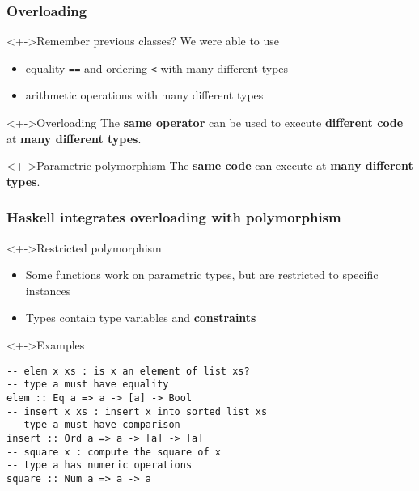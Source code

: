 \documentclass{beamer}
\subtitle{Type Classes --- Overloading in Haskell}
\begin{document}
\begin{frame}
  \titlepage
\end{frame}
\begin{frame}[fragile]
  \frametitle{Overloading}
  \begin{block}<+->{Remember previous classes?}
    We were able to use
    \begin{itemize}
    \item equality \texttt{==} and ordering \texttt{<} with many different types
    \item arithmetic operations with many different types
    \end{itemize}
  \end{block}
  \begin{block}<+->{Overloading}
    The \textbf{same operator} can be used to execute \textbf{different code} at \textbf{many different types}. 
  \end{block}
  \begin{block}<+->{Parametric polymorphism}
    The \textbf{same code} can execute at \textbf{many different types}.
  \end{block}
\end{frame}
\begin{frame}[fragile]
  \frametitle{Haskell integrates overloading with polymorphism}
  \begin{block}<+->{Restricted polymorphism}
    \begin{itemize}
    \item Some functions work on parametric types, but are restricted to specific instances
    \item Types contain type variables and \textbf{constraints}
    \end{itemize}
  \end{block}
  \begin{block}<+->{Examples}
\begin{verbatim}
-- elem x xs : is x an element of list xs?
-- type a must have equality
elem :: Eq a => a -> [a] -> Bool
-- insert x xs : insert x into sorted list xs
-- type a must have comparison
insert :: Ord a => a -> [a] -> [a]
-- square x : compute the square of x
-- type a has numeric operations
square :: Num a => a -> a
\end{verbatim}
  \end{block}
\end{frame}
\end{document}
